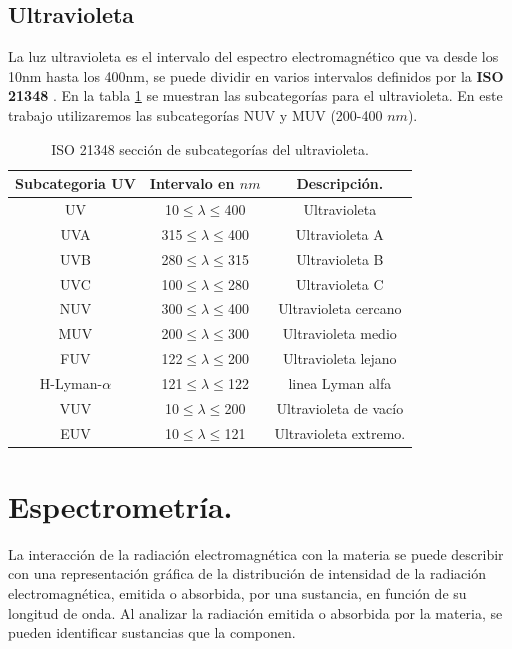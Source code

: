 \subsection{Ultravioleta}
La luz ultravioleta es el intervalo del espectro electromagnético que va desde los 10nm hasta los 400nm, se puede dividir en varios intervalos definidos por la \textbf{ISO 21348} \cite{Solar}. En la tabla \ref{tabla:UV} se muestran las subcategorías para el ultravioleta. En este trabajo utilizaremos las subcategorías NUV y MUV (200-400 $nm$). 
\begin{table}
	\centering
	\caption{ISO 21348 sección de subcategorías del ultravioleta. \cite{Solar}} 
	\label{tabla:UV}
	\begin{tabular}{|c c c|}
		\hline
		Subcategoria UV & Intervalo en \textbf{$nm$} & Descripción. \\
		\hline
		UV & 10$\leq\lambda\leq$400 & Ultravioleta \\
		\hline
		\hline
		UVA & 315$\leq\lambda\leq$400 & Ultravioleta A\\
		UVB & 280$\leq\lambda\leq$315 & Ultravioleta B\\
		UVC & 100$\leq\lambda\leq$280 & Ultravioleta C\\
		\hline
		\hline
		NUV & 300$\leq\lambda\leq$400 & Ultravioleta cercano\\
		MUV & 200$\leq\lambda\leq$300 & Ultravioleta medio\\
		FUV & 122$\leq\lambda\leq$200 & Ultravioleta lejano\\
		H-Lyman-$\alpha$ & 121$\leq\lambda\leq$122 &  linea Lyman alfa\\
		\hline\hline
		VUV & 10$\leq\lambda\leq$200 & Ultravioleta de vacío\\
		EUV & 10$\leq\lambda\leq$121 & Ultravioleta extremo.\\
		\hline
	\end{tabular}
\end{table}

\section{Espectrometría.}
La interacción de la radiación electromagnética con la materia se puede describir con una representación gráfica de la distribución de intensidad de la radiación electromagnética, emitida o absorbida, por una sustancia, en función de su longitud de onda. Al analizar la radiación emitida o absorbida por la materia, se pueden identificar sustancias que la componen. 


